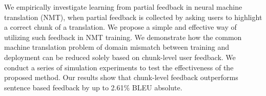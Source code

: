 We empirically investigate learning from partial feedback in neural machine translation (NMT), when partial feedback is collected by asking users to highlight a correct chunk of a translation. We propose a simple and effective way of utilizing such feedback in NMT training. We demonstrate how the common machine translation problem of domain mismatch between training and deployment can be reduced solely based on chunk-level user feedback. We conduct a series of simulation experiments to test the effectiveness of the proposed method. Our results show that chunk-level feedback outperforms sentence based feedback by up to 2.61\% BLEU absolute.
